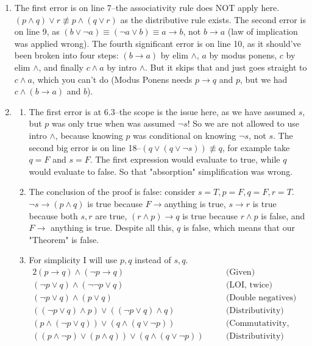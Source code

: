 \documentclass[12pt]{article}
\theoremstyle{definition}
\theoremstyle{remark}
\newcommand{\justif}[1]{&\quad &\text{(#1)}}
\newcommand{\ra}{\rightarrow}
\begin{document}
\begin{enumerate}[leftmargin=\labelsep]
		\newpage
		\item 
		The first error is on line 7--the associativity rule does NOT apply here. $(p \land q) \lor r \not \equiv p \land (q \lor r)$ as the distributive rule exists. The second error is on line 9, as $(b \lor \lnot a) \equiv (\lnot a \lor b) \equiv a \ra b$, not $b \ra a$ (law of implication was applied wrong). The fourth significant error is on line 10, as it should've been broken into four steps: $(b \ra a)$ by elim $\land$, $a$ by modus ponens, $c$ by elim $\land$, and finally $c \land a$ by intro $\land$. But it skips that and just goes straight to $c \land a$, which you can't do (Modus Ponens needs $p \ra q$ and $p$, but we had $c \land (b \ra a)$ and $b$).
		\newpage
		\item
		\begin{enumerate}
			\item
			The first error is at 6.3--the scope is the issue here, as we have assumed $s$, but $p$ was only true when was assumed $\lnot s$! So we are not allowed to use intro $\land$, because knowing $p$ was conditional on knowing $\lnot s$, not $s$. The second big error is on line 18--$(q \lor (q \lor \lnot s)) \not \equiv q$, for example take $q = F$ and $s = F$. The first expression would evaluate to true, while $q$ would evaluate to false. So that "absorption" simplification was wrong.
			\item The conclusion of the proof is false: consider $s = T, p = F, q = F, r = T$. $\lnot s \ra (p \land q)$ is true because $F \ra $anything is true, $s \ra r$ is true because both $s, r$ are true, $(r \land p) \ra q$ is true because $r \land p$ is false, and $F \ra$ anything is true. Despite all this, $q$ is false, which means that our "Theorem" is false. 
			\item For simplicity I will use $p, q$ instead of  $s, q$.
			\begin{alignat*}{2}
				(p \ra q) \land (\lnot p \ra q) \justif{Given} \\
				(\lnot p \lor q) \land (\lnot \lnot p \lor q) \justif{LOI, twice} \\
				(\lnot p \lor q) \land (p \lor q) \justif{Double negatives} \\
				((\lnot p \lor q) \land p) \lor ((\lnot p \lor q) \land q) \justif{Distributivity} \\
				(p \land (\lnot p \lor q)) \lor (q \land (q \lor \lnot p)) \justif{Commutativity, thrice} \\
				((p \land \lnot p) \lor (p \land q)) \lor (q \land (q \lor \lnot p)) \justif{Distributivity} \\

\end{alignat*}
\end{enumerate}
\end{enumerate}
\end{document}
